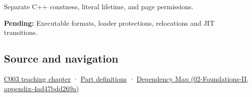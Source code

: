 Separate C++ constness, literal lifetime, and page permissions.

\textbf{Pending:} Executable formats, loader protections, relocations and JIT transitions.

\subsection{Source and navigation}\label{source-and-navigation}

\href{Continuous\%20Notes/Computing\%20Foundations\%20-\%20From\%20Bits\%20to\%20C++\%20and\%20Systems\%20APIs\#Where\%20the\%20bytes\%20live}{C003 teaching chapter} · \hyperref[appendix-fd090d982a15]{Part definitions} · \href{}{Dependency Map (02-Foundations-II, appendix-4ad47bdd269a)}
